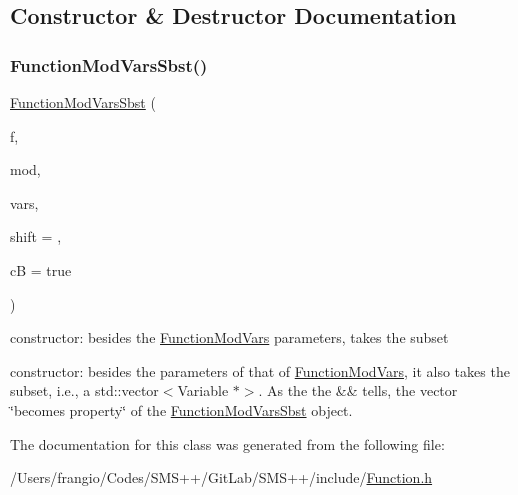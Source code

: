 \subsection{Constructor \& Destructor Documentation}
\mbox{\label{class_s_m_spp__di__unipi__it_1_1_function_mod_vars_sbst_aec1b3e831b3d816f2db937755e18881b}} 
\subsubsection{\texorpdfstring{Function\+Mod\+Vars\+Sbst()}{FunctionModVarsSbst()}}
{\footnotesize\ttfamily \mbox{\hyperlink{class_s_m_spp__di__unipi__it_1_1_function_mod_vars_sbst}{Function\+Mod\+Vars\+Sbst}} (\begin{DoxyParamCaption}\item[{\mbox{\hyperlink{class_s_m_spp__di__unipi__it_1_1_function}{Function}} $\ast$const}]{f,  }\item[{const int}]{mod,  }\item[{std\+::vector$<$ \mbox{\hyperlink{class_s_m_spp__di__unipi__it_1_1_variable}{Variable}} $\ast$$>$ \&\&}]{vars,  }\item[{const \mbox{\hyperlink{class_s_m_spp__di__unipi__it_1_1_function_mod_a44f54e31f9fa8a29194218c234876284}{Function\+Value}}}]{shift = {},  }\item[{const bool}]{cB = {\ttfamily true} }\end{DoxyParamCaption})\hspace{0.3cm}{\ttfamily [inline]}}



constructor\+: besides the \mbox{\hyperlink{class_s_m_spp__di__unipi__it_1_1_function_mod_vars}{Function\+Mod\+Vars}} parameters, takes the subset 

constructor\+: besides the parameters of that of \mbox{\hyperlink{class_s_m_spp__di__unipi__it_1_1_function_mod_vars}{Function\+Mod\+Vars}}, it also takes the subset, i.\+e., a std\+::vector$<$\+Variable $\ast$$>$. As the the \&\& tells, the vector \char`\"{}becomes property\char`\"{} of the \mbox{\hyperlink{class_s_m_spp__di__unipi__it_1_1_function_mod_vars_sbst}{Function\+Mod\+Vars\+Sbst}} object. 

The documentation for this class was generated from the following file\+:\begin{DoxyCompactItemize}
\item 
/\+Users/frangio/\+Codes/\+S\+M\+S++/\+Git\+Lab/\+S\+M\+S++/include/\mbox{\hyperlink{_function_8h}{Function.\+h}}\end{DoxyCompactItemize}

